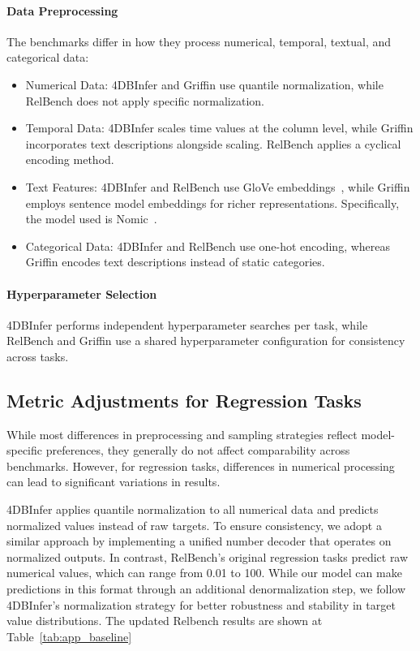\documentclass{article}
\theoremstyle{plain}
\theoremstyle{definition}
\theoremstyle{remark}
\begin{document}
\paragraph{Data Preprocessing}
The benchmarks differ in how they process numerical, temporal, textual, and categorical data:
\begin{itemize}
    \item Numerical Data: 4DBInfer and Griffin use quantile normalization, while RelBench does not apply specific normalization.
    \item Temporal Data: 4DBInfer scales time values at the column level, while Griffin incorporates text descriptions alongside scaling. RelBench applies a cyclical encoding method.
    \item Text Features: 4DBInfer and RelBench use GloVe embeddings~\citep{pennington2014glove}, while Griffin employs sentence model embeddings for richer representations. Specifically, the model used is Nomic~\citep{nussbaum2024nomic}.
    \item Categorical Data: 4DBInfer and RelBench use one-hot encoding, whereas Griffin encodes text descriptions instead of static categories.
\end{itemize}

\paragraph{Hyperparameter Selection}
4DBInfer performs independent hyperparameter searches per task, while RelBench and Griffin use a shared hyperparameter configuration for consistency across tasks.

\subsection{Metric Adjustments for Regression Tasks}

While most differences in preprocessing and sampling strategies reflect model-specific preferences, they generally do not affect comparability across benchmarks. However, for regression tasks, differences in numerical processing can lead to significant variations in results.

4DBInfer applies quantile normalization to all numerical data and predicts normalized values instead of raw targets. To ensure consistency, we adopt a similar approach by implementing a unified number decoder that operates on normalized outputs. In contrast, RelBench's original regression tasks predict raw numerical values, which can range from 0.01 to 100. While our model can make predictions in this format through an additional denormalization step, we follow 4DBInfer's normalization strategy for better robustness and stability in target value distributions. The updated Relbench results are shown at Table~\ref{tab:app_baseline}
\end{document}

